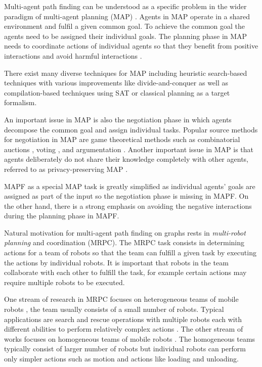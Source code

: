 \documentclass[jair,oneside,11pt]{article}
\begin{document}
Multi-agent path finding can be understood as a specific problem in the wider paradigm of multi-agent planning (MAP) \cite{DBLP:journals/mags/WeerdtC09,DBLP:journals/csur/TorrenoOKS17}. Agents in MAP operate in a shared environment and fulfil a given common goal. To achieve the common goal the agents need to be assigned their individual goals. The planning phase in MAP needs to coordinate actions of individual agents so that they benefit from positive interactions and avoid harmful interactions \cite{DBLP:conf/iat/DimopoulosM06}.

There exist many diverse techniques for MAP including heuristic search-based techniques with various improvements like divide-and-conquer \cite{DBLP:conf/aaai/EphratiR94} as well as compilation-based techniques using SAT \cite{DBLP:journals/kbs/DimopoulosHM12} or classical planning \cite{DBLP:conf/iat/DimopoulosM06} as a target formalism.

An important issue in MAP is also the negotiation phase in which agents decompose the common goal and assign individual tasks. Popular source methods for negotiation in MAP are game theoretical methods such as combinatorial auctions \cite{DBLP:journals/eswa/RobuNPS11}, voting \cite{DBLP:conf/icmas/Rosenschein95}, and argumentation \cite{DBLP:conf/ecai/SapenaOT10}. Another important issue in MAP is that agents deliberately do not share their knowledge completely with other agents, referred to as privacy-preserving MAP \cite{DBLP:journals/kais/TozickaJKP16}.

MAPF as a special MAP task is greatly simplified as individual agents' goals are assigned as part of the input so the negotiation phase is missing in MAPF. On the other hand, there is a strong emphasis on avoiding the negative interactions during the planning phase in MAPF.

Natural motivation for multi-agent path finding on graphs rests in {\em multi-robot planning} and coordination \cite{CHAI2013129,DBLP:journals/arobots/JonesDS11} (MRPC). The MRPC task consists in determining actions for a team of robots so that the team can fulfill a given task by executing the actions by individual robots. It is important that robots in the team collaborate with each other to fulfill the task, for example certain actions may require multiple robots to be executed.

One stream of research in MRPC focuses on heterogeneous teams of mobile robots \cite{Parker94}, the team usually consists of a small number of robots. Typical applications are search and rescue operations \cite{soton411031} with multiple robots each with different abilities to perform relatively complex actions \cite{DBLP:journals/arobots/JorgensenCMP18}. The other stream of works focuses on homogeneous teams of mobile robots \cite{DBLP:journals/automatica/OhPA15}. The homogeneous teams typically consist of larger number of robots but individual robots can perform only simpler actions such as motion and actions like loading and unloading.
\end{document}
